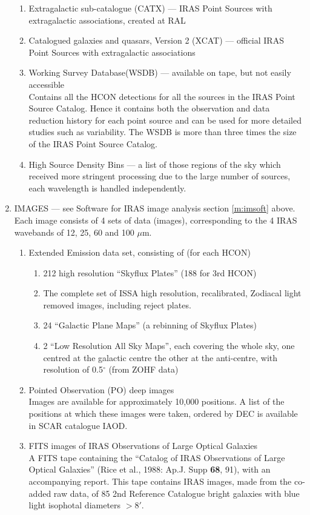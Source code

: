 \begin{enumerate}
\begin{enumerate}
	\item Extragalactic sub-catalogue (CATX) --- IRAS Point Sources with
              extragalactic associations, created at RAL
        \item Catalogued galaxies and quasars, Version 2 (XCAT) --- official
              IRAS Point Sources with extragalactic associations
	\item Working Survey Database(WSDB) --- available on tape, but not
              easily accessible\\
              Contains all the HCON detections for all the sources in the
              IRAS Point Source Catalog.
              Hence it contains both the observation and data reduction
              history for each point source and can be used for more detailed
              studies such as variability.
	      The WSDB is more than three times the size of the IRAS Point
              Source Catalog.
	\item High Source Density Bins --- a list of those regions of the sky
              which received more stringent processing due to the large number
              of sources, each wavelength is handled independently.
	\end{enumerate}
\item IMAGES --- see Software for IRAS image analysis section \ref{m:imsoft}
above.
	Each image consists of 4 sets of data (images),
	corresponding to the 4 IRAS
	wavebands of 12, 25, 60 and 100 $\mu$m.
	\begin{enumerate}
	\item Extended Emission data set, consisting of (for each HCON)\\
		\begin{enumerate}
		\item 212 high resolution ``Skyflux Plates'' (188 for 3rd HCON)
                \item The complete set of ISSA high resolution, recalibrated,
                Zodiacal light removed images, including reject plates.
		\item 24 ``Galactic Plane Maps'' (a rebinning of Skyflux Plates)
		\item 2 ``Low Resolution All Sky Maps'', each covering the
		whole sky, one centred at the galactic centre the other
		at the anti-centre, with resolution of 0.5$^{\circ}$ (from
                ZOHF data)
		\end{enumerate}
	\item Pointed Observation (PO) deep images\\
        Images are available for approximately 10,000 positions.
	A list of the positions at which these images were taken, ordered by
        DEC is available in SCAR catalogue IAOD.
	\item FITS images of IRAS Observations of Large Optical Galaxies\\
         A FITS tape containing the ``Catalog of IRAS Observations of Large
         Optical Galaxies'' (Rice et al., 1988: Ap.J. Supp {\bf 68}, 91),
         with an accompanying report. This tape contains IRAS images, made
         from the co-added raw data, of 85 2nd Reference Catalogue bright
         galaxies with blue light isophotal diameters $>$8$'$.


\end{enumerate}
\end{enumerate}
